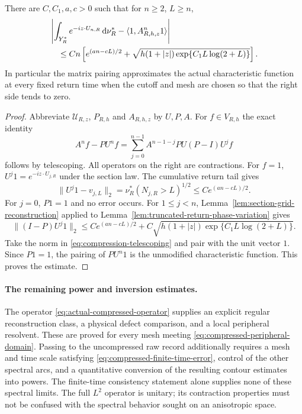 \begin{proposition}
\label{prop:compressed-finite-time-comparison}
There are $C,C_1,a,c>0$ such that for $n\ge2$, $L\ge n$,
\begin{align}
 &\left|\int_{Y_R^*}e^{-iz\cdot U_{n,R}}\,\mathrm d\nu_R^*
             -\langle1,A_{R,h,z}^n1\rangle\right|\notag\\
 &\quad\le Cn\left[
       e^{(an-cL)/2}
       +\sqrt{h(1+|z|)\exp\{C_1L\log(2+L)\}}
                    \right].
                 \label{eq:compressed-finite-time-error}
\end{align}
In particular the matrix pairing approximates the actual characteristic
function at every fixed return time when the cutoff and mesh are
chosen so that the right side tends to zero.
\end{proposition}
\begin{proof}
Abbreviate $\mathcal U_{R,z}$, $P_{R,h}$ and $A_{R,h,z}$ by $U,P,A$.
For $f\in V_{R,h}$ the exact identity
\begin{equation}\label{eq:compression-telescoping}
 A^nf-PU^nf=\sum_{j=0}^{n-1}A^{n-1-j}PU(P-I)U^jf
\end{equation}
follows by telescoping. All operators on the right are contractions.
For $f=1$, $U^j1=e^{-iz\cdot U_{j,R}}$ under the section law.
The cumulative return tail gives
\[
 \|U^j1-v_{j,L}\|_2
       =\nu_R^*(N_{j,R}>L)^{1/2}\le C e^{(an-cL)/2}.
\]
For $j=0$, $P1=1$ and no error occurs. For $1\le j<n$,
Lemma~\ref{lem:section-grid-reconstruction} applied to
Lemma~\ref{lem:truncated-return-phase-variation} gives
\[
 \|(I-P)U^j1\|_2\le C e^{(an-cL)/2}
       +C\sqrt{h(1+|z|)\exp\{C_1L\log(2+L)\}}.
\]
Take the norm in \eqref{eq:compression-telescoping} and pair with the
unit vector $1$. Since $P1=1$, the pairing of $PU^n1$ is the
unmodified characteristic function. This proves the estimate.
\end{proof}

\paragraph{The remaining power and inversion estimates.}
The operator \eqref{eq:actual-compressed-operator} supplies an explicit
regular reconstruction class, a physical defect comparison, and a
local peripheral resolvent. These are proved for every mesh meeting
\eqref{eq:compressed-peripheral-domain}. Passing to the uncompressed
raw record additionally requires a mesh and time scale satisfying
\eqref{eq:compressed-finite-time-error}, control of the other spectral
arcs, and a quantitative conversion of the resulting contour estimates
into powers. The finite-time consistency statement alone supplies
none of these spectral limits. The full $L^2$ operator is unitary;
its contraction properties must not be confused with the spectral
behavior sought on an anisotropic space.

